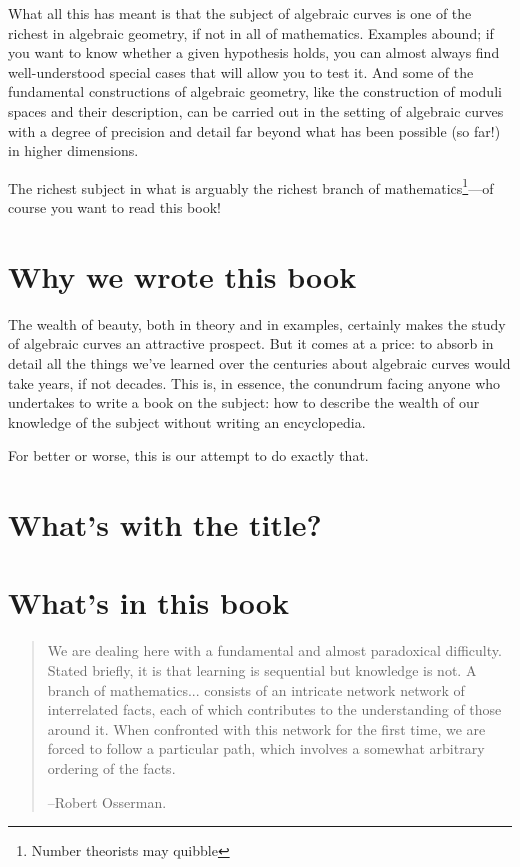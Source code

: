 What all this has meant is that the subject of algebraic curves is one of the richest in algebraic geometry, if not in all of mathematics. Examples abound; if you want to know whether a given hypothesis holds, you can almost always find well-understood special cases that will allow you to test it. And some of the fundamental constructions of algebraic geometry, like the construction of moduli spaces and their description, can be carried out in the setting of algebraic curves with a degree of precision and detail far beyond what has been possible (so far!) in higher dimensions. 

The richest subject in what is arguably the richest branch of mathematics\footnote{Number theorists may quibble}---of course you want to read this book! 

\section{Why we wrote this book}

The wealth of beauty, both in theory and in examples, certainly makes the study of algebraic curves an attractive prospect. But it comes at a price: to absorb in detail all the things we've learned over the centuries about algebraic curves would take years, if not decades. This is, in essence, the conundrum facing anyone who undertakes to write a book on the subject: how to describe the wealth of our knowledge of the subject without writing an encyclopedia.

For better or worse, this is our attempt to do exactly that.

\section{What's with the title?}




\section{What's in this book}


\begin{quote}
\small\sf
We are dealing here with a fundamental and almost paradoxical difficulty. Stated briefly, it is that learning is sequential but knowledge is not. A branch of mathematics... consists of an intricate network network of interrelated facts, each of which contributes to the understanding of those around it. When confronted with this network for the first time, we are forced to follow a particular path, which involves a somewhat arbitrary ordering of the facts.

--Robert Osserman.

\end{quote}



